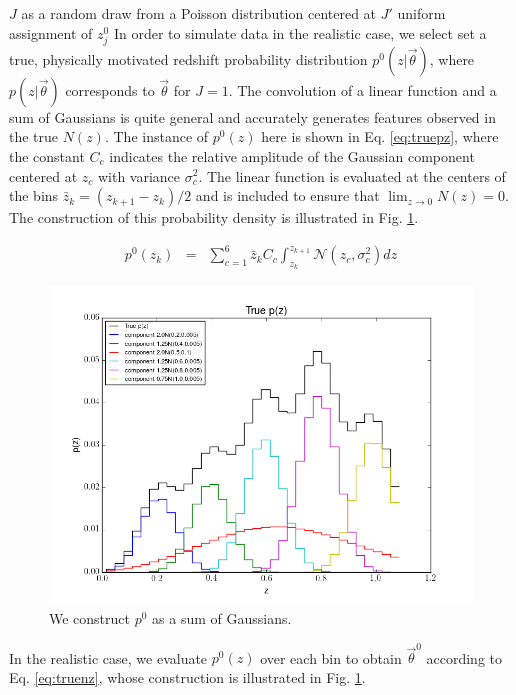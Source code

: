 \documentclass[preprint]{aastex}
\begin{document}
$J$ as a random draw from a Poisson distribution centered at $J'$
uniform assignment of $z_{j}^{0}$
In order to simulate data in the realistic case, we select set a true, physically motivated redshift probability distribution $p^{0}(z|\vec{\theta})$, where $p(z|\vec{\theta})$ corresponds to $\vec{\theta}$ for $J=1$.  The convolution of a linear function and a sum of Gaussians is quite general and accurately generates features observed in the true $N(z)$.  The instance of $p^{0}(z)$ here is shown in Eq. \ref{eq:truepz}, where the constant $C_{c}$ indicates the relative amplitude of the Gaussian component centered at $z_{c}$ with variance $\sigma_{c}^{2}$.  The linear function is evaluated at the centers of the bins $\bar{z}_{k}=(z_{k+1}-z_{k})/2$ and is included to ensure that $\lim_{z\to0}N(z)=0$.  The construction of this probability density is illustrated in Fig. \ref{fig:truepz}.  

\begin{eqnarray}
\label{eq:truepz}
p^{0}(z_{k}) &=& \sum_{c=1}^{6}\bar{z}_{k}C_{c}\int_{z_{k}}^{z_{k+1}} \mathcal{N}(z_{c},\sigma^{2}_{c})dz
\end{eqnarray}

\begin{figure}
\includegraphics[width=\textwidth]{truePz.png}
\caption{We construct $p^{0}$ as a sum of Gaussians.}
\label{fig:truepz}
\end{figure}

In the realistic case, we evaluate $p^{0}(z)$ over each bin to obtain $\vec{\theta}^{0}$ according to Eq. \ref{eq:truenz}, whose construction is illustrated in Fig. \ref{fig:truepz}.  
\end{document}
